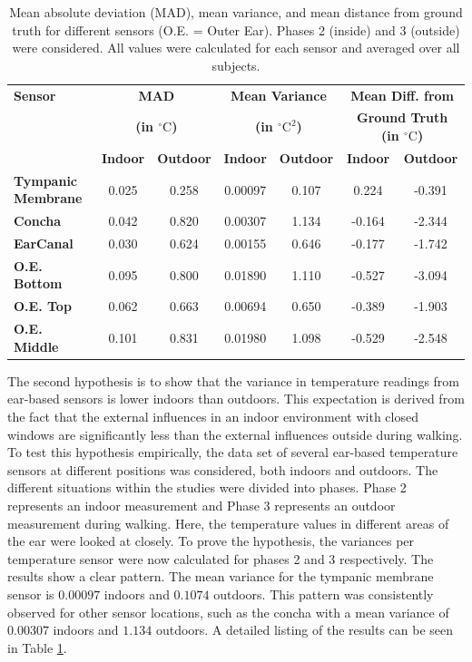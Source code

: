 \begin{table}[t]
\centering
\begin{tabular}{|p{2.5cm}|c|c|c|c|c|c|}
\hline
\textbf{Sensor} & \multicolumn{2}{c|}{\textbf{MAD}} & \multicolumn{2}{c|}{\textbf{Mean Variance}} & \multicolumn{2}{c|}{\textbf{Mean Diff. from}} \\
 & \multicolumn{2}{c|}{\textbf{(in \(^\circ\text{C}\))}} & \multicolumn{2}{c|}{\textbf{(in \(^\circ\text{C}^2\))}} & \multicolumn{2}{c|}{\textbf{Ground Truth (in \(^\circ\text{C}\))}} \\
\hline
 & \textbf{Indoor} & \textbf{Outdoor} & \textbf{Indoor} & \textbf{Outdoor} & \textbf{Indoor} & \textbf{Outdoor} \\
\hline
\textbf{Tympanic Membrane} & 0.025 & 0.258 & 0.00097 & 0.107 & 0.224 & -0.391 \\
\textbf{Concha} & 0.042 & 0.820 & 0.00307 & 1.134 & -0.164 & -2.344 \\
\textbf{EarCanal} & 0.030 & 0.624 & 0.00155 & 0.646 & -0.177 & -1.742 \\
\textbf{O.E. Bottom} & 0.095 & 0.800 & 0.01890 & 1.110 & -0.527 & -3.094 \\
\textbf{O.E. Top} & 0.062 & 0.663 & 0.00694 & 0.650 & -0.389 & -1.903 \\
\textbf{O.E. Middle} & 0.101 & 0.831 & 0.01980 & 1.098 & -0.529 & -2.548 \\
\hline
\end{tabular}
\caption{Mean absolute deviation (MAD), mean variance, and mean distance from ground truth for different sensors (O.E. = Outer Ear). Phases 2 (inside) and 3 (outside) were considered. All values were calculated for each sensor and averaged over all subjects.}
\label{subsec:Evaluation:Study1:Hypothesis2:mean_variance_table}
\end{table}

The second hypothesis is to show that the variance in temperature readings from ear-based sensors is lower indoors than outdoors.
This expectation is derived from the fact that the external influences in an indoor environment with closed windows are significantly less than the external influences outside during walking.
To test this hypothesis empirically, the data set of several ear-based temperature sensors at different positions was considered, both indoors and outdoors.
The different situations within the studies were divided into phases. 
Phase 2 represents an indoor measurement and Phase 3 represents an outdoor measurement during walking.
Here, the temperature values in different areas of the ear were looked at closely.
To prove the hypothesis, the variances per temperature sensor were now calculated for phases 2 and 3 respectively. 
The results show a clear pattern. 
The mean variance for the tympanic membrane sensor is $0.00097$ indoors and $0.1074$ outdoors.
This pattern was consistently observed for other sensor locations, such as the concha with a mean variance of $0.00307$ indoors and $1.134$ outdoors.
A detailed listing of the results can be seen in Table \ref{subsec:Evaluation:Study1:Hypothesis2:mean_variance_table}.

